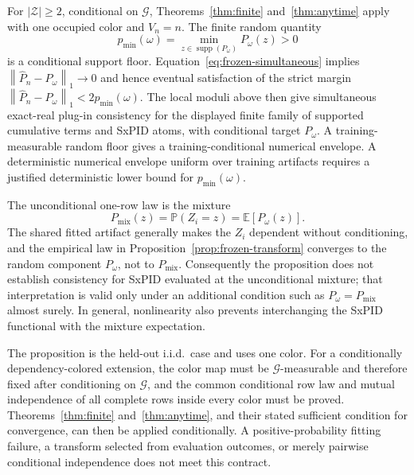 \documentclass[11pt]{article}
\theoremstyle{definition}
\newcommand{\cZ}{\mathcal{Z}}
\newcommand{\Phat}{\widehat{P}}
\newcommand{\Prb}{\mathbb{P}}
\newcommand{\E}{\mathbb{E}}
\newcommand{\supp}{\operatorname{supp}}
\newcommand{\normone}[1]{\left\lVert #1\right\rVert_1}
\begin{document}
For $|\cZ|\ge2$, conditional on $\mathcal G$, Theorems~\ref{thm:finite}
and~\ref{thm:anytime} apply with one occupied color and $V_n=n$.  The finite random quantity
\begin{equation}
  p_{\min}(\omega)
  =
  \min_{z\in\supp(P_\omega)}P_\omega(z)
  >0
\end{equation}
is a conditional support floor.  Equation~\eqref{eq:frozen-simultaneous} implies
$\normone{\Phat_n-P_\omega}\to0$ and hence eventual satisfaction of the strict margin
$\normone{\Phat_n-P_\omega}<2p_{\min}(\omega)$.  The local moduli above then give simultaneous
exact-real plug-in consistency for the displayed finite family of supported cumulative terms and
SxPID atoms, with conditional target $P_\omega$.  A training-measurable random floor gives a
training-conditional numerical envelope.  A deterministic numerical envelope uniform over
training artifacts requires a justified deterministic lower bound for $p_{\min}(\omega)$.

The unconditional one-row law is the mixture
\begin{equation}\label{eq:frozen-mixture}
  P_{\mathrm{mix}}(z)
  =
  \Prb(Z_i=z)
  =
  \E[P_\omega(z)].
\end{equation}
The shared fitted artifact generally makes the $Z_i$ dependent without conditioning, and the
empirical law in Proposition~\ref{prop:frozen-transform} converges to the random component
$P_\omega$, not to $P_{\mathrm{mix}}$.  Consequently the proposition does not establish
consistency for SxPID evaluated at the unconditional mixture; that interpretation is valid only
under an additional condition such as $P_\omega=P_{\mathrm{mix}}$ almost surely.  In general,
nonlinearity also prevents interchanging the SxPID functional with the mixture expectation.

The proposition is the held-out i.i.d.\ case and uses one color.  For a conditionally
dependency-colored extension, the color map must be $\mathcal G$-measurable and therefore fixed
after conditioning on $\mathcal G$, and
the common conditional row law and mutual independence of all complete rows inside every color
must be proved.  Theorems~\ref{thm:finite} and~\ref{thm:anytime}, and their stated sufficient
condition for convergence, can then be applied conditionally.  A positive-probability fitting
failure, a transform selected from evaluation outcomes, or merely pairwise conditional
independence does not meet this contract.
\end{document}
